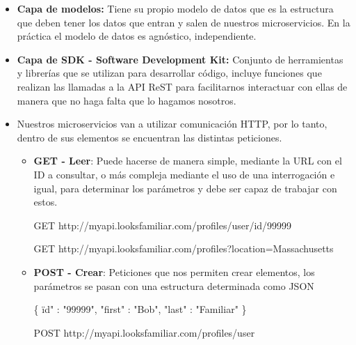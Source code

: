\documentclass[12pt, twoside, openright]{report} %
\begin{document}
\begin{itemize}
	\item \textbf{Capa de modelos:} Tiene su propio modelo de datos que es la estructura que deben tener los datos que entran y salen de nuestros microservicios. En la práctica el modelo de datos es agnóstico, independiente.
	\item \textbf{Capa de SDK - Software Development Kit:} Conjunto de herramientas y librerías que se utilizan para desarrollar código, incluye funciones que realizan las llamadas a la API ReST para facilitarnos interactuar con ellas de manera que no haga falta que lo hagamos nosotros.
	\item Nuestros microservicios van a utilizar comunicación HTTP, por lo tanto, dentro de sus elementos se encuentran las distintas peticiones.
	      \begin{itemize}
		      \item \textbf{GET - Leer}: Puede hacerse de manera simple, mediante la URL con el ID a consultar, o más compleja mediante el uso de una interrogación e igual, para determinar los parámetros y debe ser capaz de trabajar con estos.

		            GET http://myapi.looksfamiliar.com/profiles/user/id/99999

		            GET http://myapi.looksfamiliar.com/profiles?location=Massachusetts

		      \item \textbf{POST - Crear}: Peticiones que nos permiten crear elementos, los parámetros se pasan con una estructura determinada como JSON

		            \{ \"id" : "99999", "first" : "Bob", "last" : "Familiar" \}

		            POST http://myapi.looksfamiliar.com/profiles/user


\end{itemize}
\end{itemize}
\end{document}
